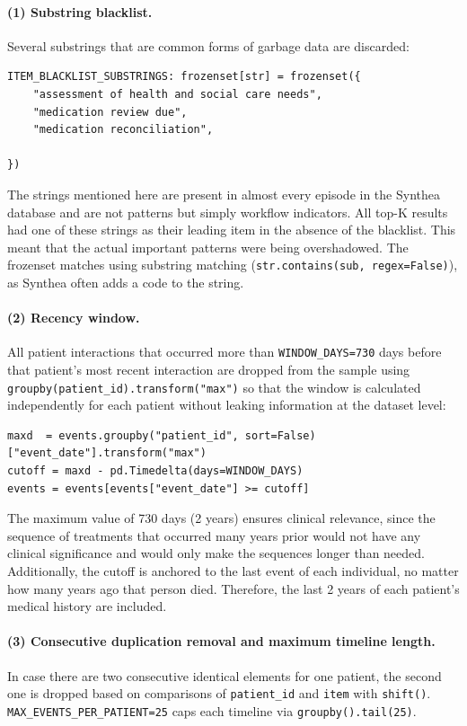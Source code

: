\paragraph{(1) Substring blacklist.} Several substrings that are common forms of garbage data are discarded:

\begin{lstlisting}[style=pythonstyle]
ITEM_BLACKLIST_SUBSTRINGS: frozenset[str] = frozenset({
    "assessment of health and social care needs",
    "medication review due",
    "medication reconciliation",

})
\end{lstlisting}

\noindent The strings mentioned here are present in almost every episode in the Synthea database and are not patterns but simply workflow indicators. All top-K results had one of these strings as their leading item in the absence of the blacklist. This meant that the actual important patterns were being overshadowed. The frozenset matches using substring matching (\texttt{str.contains(sub, regex=False)}), as Synthea often adds a code to the string.

\paragraph{(2) Recency window.} All patient interactions that occurred more than \texttt{WINDOW\_DAYS=730} days before that patient's most recent interaction are dropped from the sample using \texttt{groupby(patient\_id).transform("max")} so that the window is calculated independently for each patient without leaking information at the dataset level:

\begin{lstlisting}[style=pythonstyle]
maxd  = events.groupby("patient_id", sort=False)["event_date"].transform("max")
cutoff = maxd - pd.Timedelta(days=WINDOW_DAYS)
events = events[events["event_date"] >= cutoff]
\end{lstlisting}

\noindent The maximum value of 730 days (2 years) ensures clinical relevance, since the sequence of treatments that occurred many years prior would not have any clinical significance and would only make the sequences longer than needed. Additionally, the cutoff is anchored to the last event of each individual, no matter how many years ago that person died. Therefore, the last 2 years of each patient’s medical history are included.

\paragraph{(3) Consecutive duplication removal and maximum timeline length.} In case there are two consecutive identical elements for one patient, the second one is dropped based on comparisons of \texttt{patient\_id} and \texttt{item} with \texttt{shift()}. \texttt{MAX\_EVENTS\_PER\_PATIENT=25} caps each timeline via \texttt{groupby().tail(25)}.

